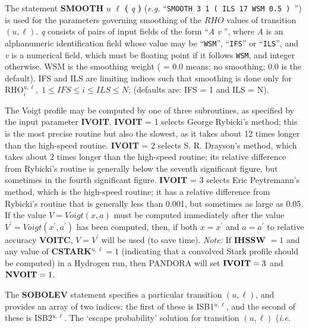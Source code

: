 \ej
\centerline{}
\space \noindent
The statement {\bf SMOOTH} $u$ $\ell$ {\bf (} {\it q} {\bf )} 
({\it e.g.} ``{\tt SMOOTH 3 1 ( ILS 17 WSM 0.5 ) }'')
is used for the parameters governing smoothing of the $RHO$ values of
transition $(u,\ell)$. {\it q} consists of pairs of input fields of the
form ``{\it A} {\it v} '', where {\it A} is an alphanumeric identification
field whose value may be ``{\tt WSM}'', ``{\tt IFS}'' or ``{\tt ILS}'', and
{\it v} is a numerical field, which must be floating point if it follows
{\tt WSM}, and integer otherwise. WSM is the smoothing weight ( = 0.0 means:
no smoothing; 0.0 is the default). IFS and ILS are limiting indices
such that smoothing is done only for RHO$^{u,\ell}_i, \; 1 \leq IFS \leq i
\leq ILS \leq N$; (defaults are: IFS = 1 and ILS = N).
\blankline
\blankline
\centerline{}
\space \noindent
The Voigt profile may be computed by one of three subroutines, as specified
by the input parameter {\bf IVOIT}. \np
{\bf IVOIT} = 1 selects George Rybicki's method; this is the most precise
routine but also the slowest, as it takes about 12 times longer than the
high-speed routine. \np
{\bf IVOIT} = 2 selects S. R. Drayson's method, which takes about 2 times
longer than the high-speed routine; its relative difference from Rybicki's
routine is generally below the seventh significant figure, but sometimes in
the fourth significant figure. \np
{\bf IVOIT} = 3 selects Eric Peytremann's method, which is the high-speed
routine; it has a relative difference from Rybicki's routine that is generally
less than 0.001, but sometimes as large as 0.05. \np
If the value $V = Voigt(x,a)$ must be computed immediately after the 
value \break $V^{\prime} = Voigt(x^{\prime},a^{\prime})$ has been computed,
then, if both $x = x^{\prime}$ and $a = a^{\prime}$ to relative accuracy
{\bf VOITC}, $V = V^{\prime}$ will be used (to save time). \np
{\it Note:} If {\bf IHSSW} $= 1$ and any value of {\bf CSTARK}$^{u,\ell} = 1$
(indicating that a convolved Stark profile should be computed) in a Hydrogen
run, then PANDORA will set ${\bf IVOIT} = 3$ and ${\bf NVOIT} = 1$.
\ej
\centerline{}
\space \noindent
The {\bf SOBOLEV} statement specifies a particular transition $(u, \ell)$,
and provides an array of two indices: the first of these is ISB1$^{u, \ell}$,
and the second of these is ISB2$^{u, \ell}$. \np
The `escape probability' solution for transition $(u,\ell)$ ({\it i.e.}
